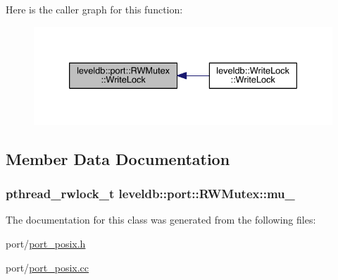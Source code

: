 Here is the caller graph for this function\+:\nopagebreak
\begin{figure}[H]
\begin{center}
\leavevmode
\includegraphics[width=333pt]{classleveldb_1_1port_1_1_r_w_mutex_ad2ef416ac41375c282e378c296a1852e_icgraph}
\end{center}
\end{figure}




\subsection{Member Data Documentation}
\hypertarget{classleveldb_1_1port_1_1_r_w_mutex_a7849927186af9e32d8ac7b3af4c26a5e}{}
\subsubsection[{mu\+\_\+}]{\setlength{\rightskip}{0pt plus 5cm}pthread\+\_\+rwlock\+\_\+t leveldb\+::port\+::\+R\+W\+Mutex\+::mu\+\_\+\hspace{0.3cm}{\ttfamily [private]}}\label{classleveldb_1_1port_1_1_r_w_mutex_a7849927186af9e32d8ac7b3af4c26a5e}


The documentation for this class was generated from the following files\+:\begin{DoxyCompactItemize}
\item 
port/\hyperlink{port__posix_8h}{port\+\_\+posix.\+h}\item 
port/\hyperlink{port__posix_8cc}{port\+\_\+posix.\+cc}\end{DoxyCompactItemize}
